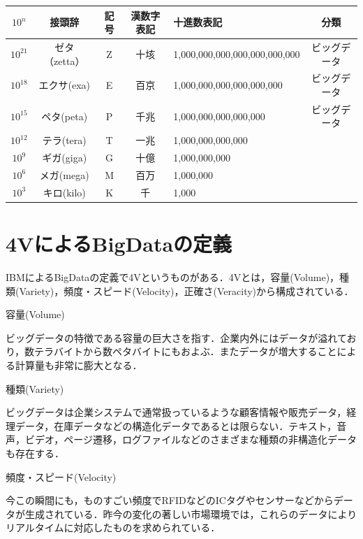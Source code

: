 \begin{table}[H]
  \begin{tabular}{|c|c|c|c|l|c|} \hline
    $10^n$ & 接頭辞 & 記号 & 漢数字表記 & 十進数表記 & 分類 \\ \hline
    $10^21$ & ゼタ（zetta） & Z & 十垓 & 1,000,000,000,000,000,000,000 & ビッグデータ \\ \hline
    $10^18$ & エクサ(exa) & E & 百京 & 1,000,000,000,000,000,000 & ビッグデータ \\ \hline
    $10^15$ & ペタ(peta) & P & 千兆 & 1,000,000,000,000,000 & ビッグデータ \\ \hline
    $10^12$ & テラ(tera) & T & 一兆 & 1,000,000,000,000 &  \\ \hline
    $10^9$ & ギガ(giga) & G & 十億 & 1,000,000,000 &  \\ \hline
    $10^6$ & メガ(mega) & M & 百万 & 1,000,000 &  \\ \hline
    $10^3$ & キロ(kilo) & K & 千 & 1,000 &  \\ \hline
  \end{tabular}
\end{table}



\section{4VによるBigDataの定義}


IBMによるBigDataの定義で4Vというものがある．4Vとは，容量(Volume)，種類(Variety)，頻度・スピード(Velocity)，正確さ(Veracity)から構成されている．



容量(Volume)

ビッグデータの特徴である容量の巨大さを指す．企業内外にはデータが溢れており，数テラバイトから数ペタバイトにもおよぶ．またデータが増大することによる計算量も非常に膨大となる．



種類(Variety)

ビッグデータは企業システムで通常扱っているような顧客情報や販売データ，経理データ，在庫データなどの構造化データであるとは限らない．テキスト，音声，ビデオ，ページ遷移，ログファイルなどのさまざまな種類の非構造化データも存在する．



頻度・スピード(Velocity)

今この瞬間にも，ものすごい頻度でRFIDなどのICタグやセンサーなどからデータが生成されている．昨今の変化の著しい市場環境では，これらのデータによりリアルタイムに対応したものを求められている．



